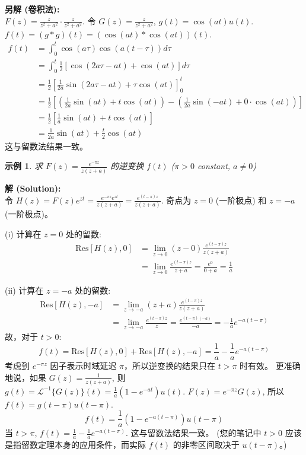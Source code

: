 \documentclass[linespread=1.5,openany]{book}%
\def\diff{d}%
\theoremstyle{plain}
\newtheorem{example}[theorem]{示例}
\newcommand{\diff}{\mathop{}\!\mathrm{d}}  %
\begin{document}
{{{{{{{									\noindent\textbf{另解 (卷积法):} \\
									$F(z) = \frac{z}{z^2+a^2} \cdot \frac{z}{z^2+a^2}$.
									令 $G(z) = \frac{z}{z^2+a^2}$, $g(t) = \cos(at)u(t)$.
									$f(t) = (g*g)(t) = (\cos(at) * \cos(at))(t)$.
									\begin{align*}
										f(t) &= \int_0^t \cos(a\tau)\cos(a(t-\tau)) \diff \tau \\[6pt]
										&= \int_0^t \frac{1}{2} [\cos(2a\tau - at) + \cos(at)] \diff \tau \\[6pt]
										&= \frac{1}{2} \left[ \frac{1}{2a}\sin(2a\tau - at) + \tau\cos(at) \right]_0^t \\[6pt]
										&= \frac{1}{2} \left[ \left(\frac{1}{2a}\sin(at) + t\cos(at)\right) - \left(\frac{1}{2a}\sin(-at) + 0\cdot\cos(at)\right) \right] \\[6pt]
										&= \frac{1}{2} \left[ \frac{1}{a}\sin(at) + t\cos(at) \right] \\[6pt]
										&= \frac{1}{2a}\sin(at) + \frac{t}{2}\cos(at)
									\end{align*}
									这与留数法结果一致。
									
									
									\begin{example}求 $F(z) = \frac{e^{-\pi z}}{z(z+a)}$ 的逆变换 $f(t)$ ($\pi>0$ constant, $a \neq 0$) \label{ex:L16_inv_laplace_ex8_corrected_spaced}
									\end{example}
									\noindent\textbf{解 (Solution):} \\
									令 $H(z) = F(z)e^{zt} = \frac{e^{-\pi z}e^{zt}}{z(z+a)} = \frac{e^{(t-\pi)z}}{z(z+a)}$.
									奇点为 $z=0$ (一阶极点) 和 $z=-a$ (一阶极点)。
									
									(i) 计算在 $z=0$ 处的留数:
									\begin{align*}
										\text{Res}[H(z), 0] &= \lim_{z\to 0} (z-0) \frac{e^{(t-\pi)z}}{z(z+a)} \\[6pt]
										&= \lim_{z\to 0} \frac{e^{(t-\pi)z}}{z+a} = \frac{e^0}{0+a} = \frac{1}{a}
									\end{align*}
									
									(ii) 计算在 $z=-a$ 处的留数:
									\begin{align*}
										\text{Res}[H(z), -a] &= \lim_{z\to -a} (z+a) \frac{e^{(t-\pi)z}}{z(z+a)} \\[6pt]
										&= \lim_{z\to -a} \frac{e^{(t-\pi)z}}{z} = \frac{e^{(t-\pi)(-a)}}{-a} = -\frac{1}{a}e^{-a(t-\pi)}
									\end{align*}
									故，对于 $t>0$:
									\[ f(t) = \text{Res}[H(z), 0] + \text{Res}[H(z), -a] = \frac{1}{a} - \frac{1}{a}e^{-a(t-\pi)} \]
									考虑到 $e^{-\pi z}$ 因子表示时域延迟 $\pi$，所以逆变换的结果只在 $t>\pi$ 时有效。
									更准确地说，如果 $G(z) = \frac{1}{z(z+a)}$, 则 $g(t) = \mathcal{L}^{-1}\{G(z)\}(t) = \frac{1}{a}(1-e^{-at})u(t)$.
									$F(z) = e^{-\pi z}G(z)$, 所以 $f(t) = g(t-\pi)u(t-\pi)$.
									\[ f(t) = \frac{1}{a}(1-e^{-a(t-\pi)})u(t-\pi) \]
									当 $t>\pi$, $f(t) = \frac{1}{a} - \frac{1}{a}e^{-a(t-\pi)}$. 这与留数法结果一致。
									(您的笔记中 $t>0$ 应该是指留数定理本身的应用条件，而实际 $f(t)$ 的非零区间取决于 $u(t-\pi)$。)
									\vspace{\baselineskip}
									
}}}}}}}
\end{document}
